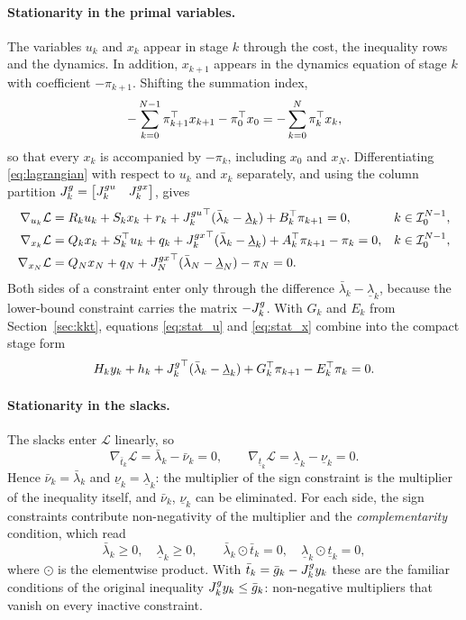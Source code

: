 \paragraph{Stationarity in the primal variables.}
The variables $u_k$ and $x_k$ appear in stage $k$ through the cost, the inequality rows and the dynamics.
In addition, $x_{k+1}$ appears in the dynamics equation of stage $k$ with coefficient $-\pi_{k+1}$.
Shifting the summation index,
\[
    -\sum_{k=0}^{N-1}\pi_{k+1}^\top x_{k+1} - \pi_0^\top x_0 = -\sum_{k=0}^{N}\pi_k^\top x_k ,
\]
so that every $x_k$ is accompanied by $-\pi_k$, including $x_0$ and $x_N$.
Differentiating \eqref{eq:lagrangian} with respect to $u_k$ and $x_k$ separately, and using the column partition ${J^{g}_{k}} = \begin{bmatrix} {J^{gu}_{k}} & {J^{gx}_{k}} \end{bmatrix}$, gives
\begin{align}
    \nabla_{u_k}\mathcal{L} &= R_k u_k + S_k x_k + r_k + {J^{gu}_{k}}^\top(\bar{\lambda}_k - \underline{\lambda}_k) + B_k^\top \pi_{k+1} = 0, && k\in\mathcal{I}_{0}^{N-1}, \label{eq:stat_u}\\
    \nabla_{x_k}\mathcal{L} &= Q_k x_k + S_k^\top u_k + q_k + {J^{gx}_{k}}^\top(\bar{\lambda}_k - \underline{\lambda}_k) + A_k^\top \pi_{k+1} - \pi_k = 0, && k\in\mathcal{I}_{0}^{N-1}, \label{eq:stat_x}\\
    \nabla_{x_N}\mathcal{L} &= Q_N x_N + q_N + {J^{gx}_{N}}^\top(\bar{\lambda}_N - \underline{\lambda}_N) - \pi_N = 0. && \label{eq:stat_x_N}
\end{align}
Both sides of a constraint enter only through the difference $\bar{\lambda}_k - \underline{\lambda}_k$, because the lower-bound constraint carries the matrix $-{J^{g}_{k}}$.
With $G_k$ and $E_k$ from Section~\ref{sec:kkt}, equations \eqref{eq:stat_u} and \eqref{eq:stat_x} combine into the compact stage form
\begin{equation} \label{eq:stat_y}
    H_k y_k + h_k + {J^{g}_{k}}^\top(\bar{\lambda}_k - \underline{\lambda}_k) + G_k^\top \pi_{k+1} - E_k^\top \pi_k = 0 .
\end{equation}

\paragraph{Stationarity in the slacks.}
The slacks enter $\mathcal{L}$ linearly, so
\[
    \nabla_{\bar{t}_k}\mathcal{L} = \bar{\lambda}_k - \bar{\nu}_k = 0 ,
    \qquad
    \nabla_{\underline{t}_k}\mathcal{L} = \underline{\lambda}_k - \underline{\nu}_k = 0 .
\]
Hence $\bar{\nu}_k = \bar{\lambda}_k$ and $\underline{\nu}_k = \underline{\lambda}_k$:
the multiplier of the sign constraint is the multiplier of the inequality itself, and $\bar{\nu}_k$, $\underline{\nu}_k$ can be eliminated.
For each side, the sign constraints contribute non-negativity of the multiplier and the \textit{complementarity} condition, which read
\[
    \bar{\lambda}_k \geq 0,\quad \underline{\lambda}_k \geq 0,\qquad
    \bar{\lambda}_k \odot \bar{t}_k = 0,\quad \underline{\lambda}_k \odot \underline{t}_k = 0 ,
\]
where $\odot$ is the elementwise product.
With $\bar{t}_k = \bar{g}_k - {J^{g}_{k}} y_k$ these are the familiar conditions of the original inequality ${J^{g}_{k}} y_k \leq \bar{g}_k$:
non-negative multipliers that vanish on every inactive constraint.

